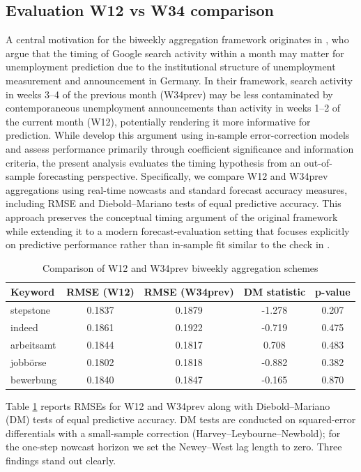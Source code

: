 \documentclass[12pt,a4paper]{article}
\begin{document}
\subsection{Evaluation W12 vs W34 comparison}
A central motivation for the biweekly aggregation framework originates in \citet{Askitas}, who argue that the timing of Google search activity within a month may matter for unemployment prediction due to the institutional structure of unemployment measurement and announcement in Germany. In their framework, search activity in weeks 3–4 of the previous month (W34prev) may be less contaminated by contemporaneous unemployment announcements than activity in weeks 1–2 of the current month (W12), potentially rendering it more informative for prediction.
While \citet{Askitas} develop this argument using in-sample error-correction models and assess performance primarily through coefficient significance and information criteria, the present analysis evaluates the timing hypothesis from an out-of-sample forecasting perspective. Specifically, we compare W12 and W34prev aggregations using real-time nowcasts and standard forecast accuracy measures, including RMSE and Diebold–Mariano tests of equal predictive accuracy. This approach preserves the conceptual timing argument of the original framework while extending it to a modern forecast-evaluation setting that focuses explicitly on predictive performance rather than in-sample fit similar to the check in \citet{COSTA2024101963}.
\begin{table}[ht!]
\centering
\caption{Comparison of W12 and W34prev biweekly aggregation schemes}
\label{tab:w12_w34_comparison}
\begin{tabular}{lcccc}
\toprule
\textbf{Keyword} & \textbf{RMSE (W12)} & \textbf{RMSE (W34prev)} & \textbf{DM statistic} & \textbf{p-value} \\
\midrule
stepstone   & 0.1837 & 0.1879 &  -1.278 & 0.207 \\
indeed      & 0.1861 & 0.1922 &  -0.719 & 0.475 \\
arbeitsamt  & 0.1844 & 0.1817 &   0.708 & 0.483 \\
jobbörse    & 0.1802 & 0.1818 &  -0.882 & 0.382 \\
bewerbung   & 0.1840 & 0.1847 &  -0.165 & 0.870 \\
\bottomrule
\end{tabular}
\end{table}
Table \ref{tab:w12_w34_comparison} reports RMSEs for W12 and W34prev along with Diebold–Mariano (DM) tests of equal predictive accuracy. DM tests are conducted on squared-error differentials with a small-sample correction (Harvey–Leybourne–Newbold); for the one-step nowcast horizon we set the Newey–West lag length to zero. Three findings stand out clearly.\\
\end{document}
